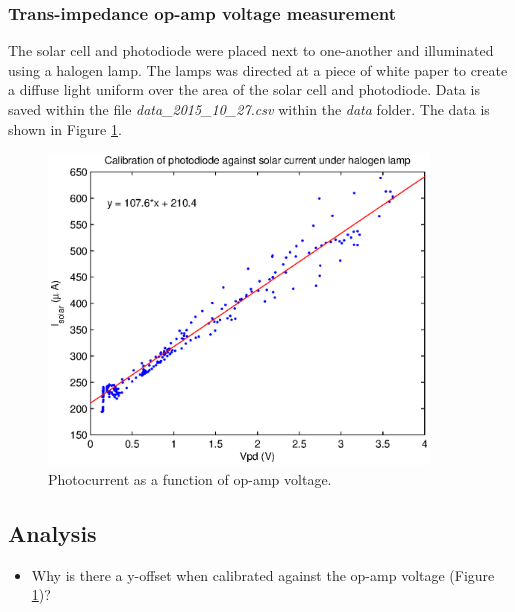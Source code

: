 \documentclass[11pt]{article} %
\begin{document}
\subsubsection{Trans-impedance op-amp voltage measurement}
The solar cell and photodiode were placed next to one-another and illuminated using a halogen lamp.  The lamps was directed at a piece of white paper to create a diffuse light uniform over the area of the solar cell and photodiode.  Data is saved within the file \emph{data\_2015\_10\_27.csv} within the \emph{data} folder.  The data is shown in Figure \ref{fig:data_2015_10_27}.
\begin{figure}[htbp]
	\center
	\includegraphics[width = 0.9\textwidth]{../images/data_2015_10_27.eps}
	\caption{Photocurrent as a function of op-amp voltage.}
	\label{fig:data_2015_10_27}
\end{figure}

\subsection{Analysis}
\begin{itemize}
	\item Why is there a y-offset when calibrated against the op-amp voltage (Figure \ref{fig:data_2015_10_27})?
\end{itemize}
\end{document}
